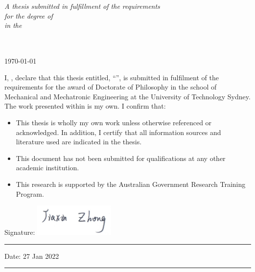 \documentclass[
    11pt, %
    english, %
    onehalfspacing, %
    headsepline, %
]{MastersDoctoralThesis} %
\begin{document}
\begin{titlepage}
\begin{center}
\vfill

\large \textit{A thesis submitted in fulfillment of the requirements\\ for the degree of \degreename}\\[0.3cm] %
\textit{in the}\\[0.4cm]
\groupname\\\deptname\\[2cm] %
 
\vfill

{\large \today}\\[4cm] %
 
\vfill
\end{center}
\end{titlepage}


\begin{declaration}
\addchaptertocentry{\authorshipname} %
\noindent I, \authorname, declare that this thesis entitled, \enquote{\ttitle}, is submitted in fulfilment of the requirements for the award of Doctorate of Philosophy in the school of Mechanical and Mechatronic Engineering at the University of Technology Sydney. 
The work presented within is my own. 
I confirm that:
\begin{itemize} 
    \item This thesis is wholly my own work unless otherwise referenced or acknowledged. In addition, I certify that all information sources and literature used are indicated in the thesis.  
\item This document has not been submitted for qualifications at any other academic institution.
\item This research is supported by the Australian Government Research Training Program.  
\end{itemize}
 
\noindent Signature: \includegraphics[width = 4cm]{fig/Signature-EN1-20181030.jpg}\\
\rule[0.5em]{25em}{0.5pt} %
 
\noindent Date: 27 Jan 2022 \\
\rule[0.5em]{25em}{0.5pt} %
\end{declaration}
\end{document}
